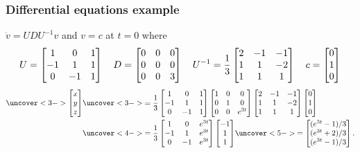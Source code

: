 \documentclass[9pt]{beamer}
\begin{document}
\begin{frame}[t]
 \frametitle{Differential equations example}
 $\dot{v}=UDU^{-1}v$ and $v=c$ at $t=0$ where 
 \[ U = \left[\begin{matrix} 1 & 0 & 1 \\ -1 & 1 & 1 \\ 0 & -1 & 1 \end{matrix}\right]
    \quad
    D = \left[\begin{matrix} 0 & 0 & 0 \\ 0 & 0 & 0 \\ 0 & 0 & 3 \end{matrix}\right]
    \quad
    U^{-1} = \frac{1}{3}
     \left[\begin{matrix} 2 & -1 & -1 \\ 1 & 1 & -2 \\ 1 & 1 & 1 \end{matrix}\right]
    \quad
    c = \left[\begin{matrix} 0 \\ 1 \\ 0 \end{matrix}\right]
 \] 
 \reminderbar
 \begin{align*}
       \uc<3->{\bbm x \\ y \\ z \ebm}
    &\uc<3->{= \frac{1}{3}
       \bbm 1 & 0 & 1 \\ -1 & 1 & 1 \\ 0 & -1 & 1 \ebm
       \bbm 1 & 0 & 0 \\ 0 & 1 & 0 \\ 0 & 0 & e^{3t} \ebm 
       \bbm 2 & -1 & -1 \\ 1 & 1 & -2 \\ 1 & 1 & 1 \ebm
       \bbm 0 \\ 1 \\ 0 \ebm} \\
    &\uc<4->{= \frac{1}{3}
       \bbm 1 & 0 & e^{3t} \\ -1 & 1 & e^{3t} \\ 0 & -1 & e^{3t} \ebm
       \bbm -1 \\ 1 \\ 1 \ebm} 
     \uc<5->{= \bbm (e^{3t}-1)/3 \\ (e^{3t}+2)/3 \\ (e^{3t}-1)/3 \ebm.}
 \end{align*}
\end{frame}
\end{document}
